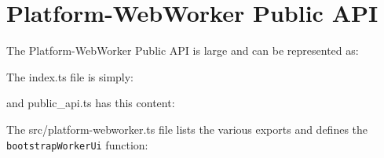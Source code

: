\section{Platform-WebWorker Public API}

The Platform-WebWorker Public API is large and can be represented as:

The index.ts file is simply:



and public\_api.ts has this content:



The src/platform-webworker.ts file lists the various exports and defines the
\texttt{bootstrapWorkerUi}
function:


